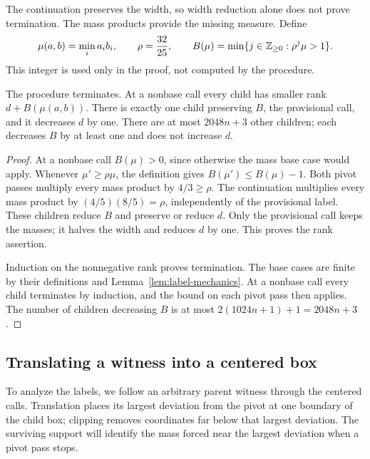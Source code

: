 The continuation preserves the width, so width reduction alone does
not prove termination.  The mass products provide the missing
measure.  Define
\begin{equation}
 \mu(a,b)=\min_i a_i b_i,\qquad \rho=\frac{32}{25},\qquad
 B(\mu)=\min\{j\in\mathbb Z_{\ge0}:\rho^j\mu>1\}.
 \label{eq:label-budget}
\end{equation}
This integer is used only in the proof, not computed by the procedure.

\begin{lemma}
\label{lem:label-rank}
The procedure terminates.  At a nonbase call every child has smaller
rank $d+B(\mu(a,b))$.  There is exactly one child preserving $B$,
the provisional call, and it decreases $d$ by one.  There are at most
$2048n+3$ other children; each decreases $B$ by at least one and
does not increase $d$.
\end{lemma}

\begin{proof}
At a nonbase call $B(\mu)>0$, since otherwise the mass base case
would apply.  Whenever $\mu'\ge\rho\mu$, the definition gives
$B(\mu')\le B(\mu)-1$.  Both pivot passes multiply every mass
product by $4/3\ge\rho$.  The continuation multiplies every mass
product by $(4/5)(8/5)=\rho$, independently of the provisional
label.  These children reduce $B$ and preserve or reduce $d$.
Only the provisional call keeps the masses; it halves the width
and reduces $d$ by one.  This proves the rank assertion.

Induction on the nonnegative rank proves termination.  The base cases
are finite by their definitions and Lemma~\ref{lem:label-mechanics}.
At a nonbase call every child terminates by induction, and the bound
on each pivot pass then applies.  The number of children decreasing
$B$ is at most $2(1024n+1)+1=2048n+3$.
\end{proof}

\subsection{Translating a witness into a centered box}

To analyze the labels, we follow an arbitrary parent witness through
the centered calls.  Translation places its largest deviation from
the pivot at one boundary of the child box; clipping removes
coordinates far below that largest deviation.  The surviving support
will identify the mass forced near the largest deviation when a
pivot pass stops.

